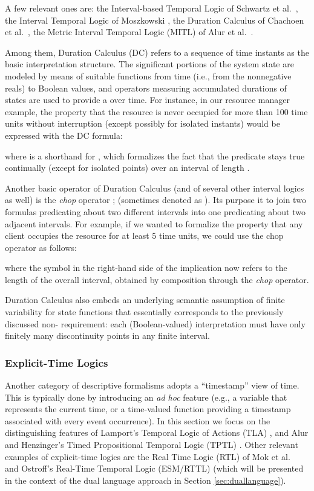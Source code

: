 A few relevant ones are: the Interval-based Temporal Logic of 
Schwartz et al.~\cite{SMV83}, the Interval Temporal Logic of Moszkowski \cite{Mos83,Mos86},
the Duration Calculus of Chachoen et al.~\cite{CHR91}, the Metric Interval Temporal Logic (MITL)
of Alur et al.~\cite{AFH96}. 

Among them, Duration Calculus (DC) refers to a  sequence of
time instants as the basic interpretation structure. The significant
portions of the system state are modeled by means of suitable
functions from time (i.e., from the nonnegative reals) to Boolean
values, and operators measuring accumulated durations of states are
used to provide a  over time. For instance, in our resource
manager example, the property that the resource is never occupied for
more than 100 time units without interruption (except possibly for
isolated instants) would be expressed with the DC formula:

where  is a shorthand for , which formalizes the 
fact that the predicate  stays true continually (except for isolated points) over an interval of length .

Another basic operator of Duration Calculus (and of several other 
interval logics as well) is the \emph{chop} operator ; (sometimes denoted as ).
Its purpose it to join two formulas predicating 
about two different intervals into one predicating about two 
adjacent intervals. For example, if we wanted to formalize 
the property that any client occupies the resource for at least 
5 time units, we could use the chop operator as follows:

where the symbol  in the right-hand side of the implication 
now refers to the length of the overall interval, obtained by 
composition through the \emph{chop} operator.

Duration Calculus also embeds an underlying semantic assumption 
of finite variability for state functions that essentially corresponds 
to the previously discussed non- requirement: each (Boolean-valued) 
interpretation must have only finitely many discontinuity points 
in any finite interval.


\subsubsection{Explicit-Time Logics} \label{sec:logicswtime}
Another category of descriptive formalisms adopts a ``timestamp'' 
 view of time. This is typically done by introducing an \emph{ad hoc}
feature (e.g., a variable that represents the current time, 
or a time-valued function providing a timestamp associated with 
every event occurrence). In this section we focus on the distinguishing 
features of Lamport's Temporal Logic of Actions (TLA) \cite{Lam94}, 
and Alur and Henzinger's Timed Propositional Temporal Logic (TPTL) \cite{AH94}.
Other relevant examples of explicit-time logics are the Real Time Logic (RTL) of Mok et al.~\cite{JM86}
and Ostroff's Real-Time Temporal Logic (ESM/RTTL) \cite{Ost89} (which will be presented in 
the context of the dual language approach in Section \ref{sec:duallanguage}).


